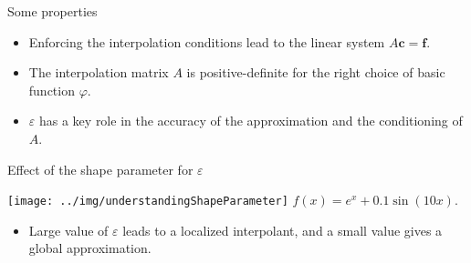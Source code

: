 \documentclass{beamer}
\begin{document}
\begin{frame}{Some properties}
  \begin{itemize}
    \item Enforcing the interpolation conditions lead to the linear system 
      $A\mathbf{c} = \mathbf{f}$.
      
    \item The interpolation matrix $A$ is positive-definite for the right choice
      of basic function $\varphi$.

    \item $\varepsilon$ has a key role in the accuracy of the approximation and
      the conditioning of $A$.
  \end{itemize}
\end{frame}

\begin{frame}{Effect of the shape parameter for $\varepsilon$}
  \begin{center}
    \texttt{[image: ../img/understandingShapeParameter]}
    $f(x) = e^x + 0.1\sin(10x)$.
  \end{center}

  \begin{itemize}
    \item Large value of $\varepsilon$ leads to a localized interpolant, and a
      small value gives a global approximation.
  \end{itemize}
\end{frame}
\end{document}
